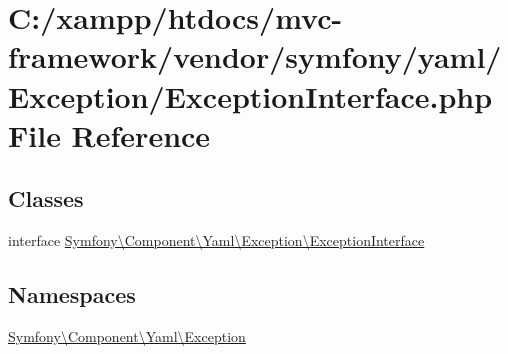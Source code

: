 \hypertarget{symfony_2yaml_2_exception_2_exception_interface_8php}{}\section{C\+:/xampp/htdocs/mvc-\/framework/vendor/symfony/yaml/\+Exception/\+Exception\+Interface.php File Reference}
\label{symfony_2yaml_2_exception_2_exception_interface_8php}
\subsection*{Classes}
\begin{DoxyCompactItemize}
\item 
interface \hyperlink{interface_symfony_1_1_component_1_1_yaml_1_1_exception_1_1_exception_interface}{Symfony\textbackslash{}\+Component\textbackslash{}\+Yaml\textbackslash{}\+Exception\textbackslash{}\+Exception\+Interface}
\end{DoxyCompactItemize}
\subsection*{Namespaces}
\begin{DoxyCompactItemize}
\item 
 \hyperlink{namespace_symfony_1_1_component_1_1_yaml_1_1_exception}{Symfony\textbackslash{}\+Component\textbackslash{}\+Yaml\textbackslash{}\+Exception}
\end{DoxyCompactItemize}
